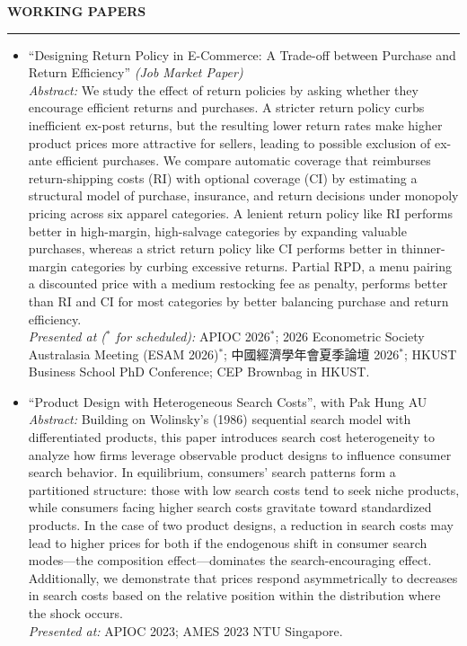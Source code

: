 \documentclass[11pt,letterpaper]{article}
\newcommand{\sectionheader}[1]{%
  \vspace{0.55em}
  {\large\bfseries #1}\\[-0.15em]
  \rule{\textwidth}{0.4pt}\par
  \vspace{0.25em}
}
\begin{document}
\vspace{-0.55em}
\sectionheader{WORKING PAPERS}
\begin{itemize}
  \item ``Designing Return Policy in E-Commerce: A Trade-off between Purchase and Return Efficiency'' \textit{(Job Market Paper)}\\[0.2em]
  \textit{Abstract:} We study the effect of return policies by asking whether they encourage efficient returns and purchases. A stricter return policy curbs inefficient ex-post returns, but the resulting lower return rates make higher product prices more attractive for sellers, leading to possible exclusion of ex-ante efficient purchases. We compare automatic coverage that reimburses return-shipping costs (RI) with optional coverage (CI) by estimating a structural model of purchase, insurance, and return decisions under monopoly pricing across six apparel categories. A lenient return policy like RI performs better in high-margin, high-salvage categories by expanding valuable purchases, whereas a strict return policy like CI performs better in thinner-margin categories by curbing excessive returns. Partial RPD, a menu pairing a discounted price with a medium restocking fee as penalty, performs better than RI and CI for most categories by better balancing purchase and return efficiency.\\[0.2em]
  \textit{Presented at ($^{\ast}$ for scheduled):} APIOC 2026$^{\ast}$; 2026 Econometric Society Australasia Meeting (ESAM 2026)$^{\ast}$; 中國經濟學年會夏季論壇 2026$^{\ast}$; HKUST Business School PhD Conference; CEP Brownbag in HKUST.

  \item ``Product Design with Heterogeneous Search Costs'', with Pak Hung AU\\[0.2em]
  \textit{Abstract:} Building on Wolinsky's (1986) sequential search model with differentiated products, this paper introduces search cost heterogeneity to analyze how firms leverage observable product designs to influence consumer search behavior. In equilibrium, consumers' search patterns form a partitioned structure: those with low search costs tend to seek niche products, while consumers facing higher search costs gravitate toward standardized products. In the case of two product designs, a reduction in search costs may lead to higher prices for both if the endogenous shift in consumer search modes---the composition effect---dominates the search-encouraging effect. Additionally, we demonstrate that prices respond asymmetrically to decreases in search costs based on the relative position within the distribution where the shock occurs.\\[0.2em]
  \textit{Presented at:} APIOC 2023; AMES 2023 NTU Singapore.
\end{itemize}
\end{document}
